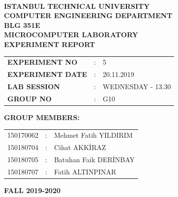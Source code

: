 \documentclass[pdftex,12pt,a4paper]{article}
\begin{document}
\begin{titlepage}
\begin{center}
\textbf{}\\
\textbf{\Large{ISTANBUL TECHNICAL UNIVERSITY}}\\
\vspace{0.5cm}
\textbf{\Large{COMPUTER ENGINEERING DEPARTMENT}}\\
\vspace{2cm}
\textbf{\Large{BLG 351E\\ MICROCOMPUTER LABORATORY\\ EXPERIMENT REPORT}}\\
\vspace{2.8cm}
\begin{table}[ht]
\centering
\Large{
\begin{tabular}{lcl}
\textbf{EXPERIMENT NO}  & : & 5 \\
\textbf{EXPERIMENT DATE}  & : & 20.11.2019 \\
\textbf{LAB SESSION}  & : & WEDNESDAY - 13.30 \\
\textbf{GROUP NO}  & : & G10 \\
\end{tabular}}
\end{table}
\vspace{1cm}
\textbf{\Large{GROUP MEMBERS:}}\\
\begin{table}[ht]
\centering
\Large{
\begin{tabular}{rcl}
150170062  & : & Mehmet Fatih YILDIRIM \\
150180704  & : & Cihat AKK\.{I}RAZ \\
150180705  & : & Batuhan Faik DER\.{I}NBAY \\
150180707  & : & Fatih ALTINPINAR \\
\end{tabular}}
\end{table}
\vspace{2.8cm}
\textbf{\Large{FALL 2019-2020}}

\end{center}

\end{titlepage}

\newpage


\thispagestyle{empty}
\setcounter{tocdepth}{4}
\tableofcontents
\clearpage

\setcounter{page}{1}
\end{document}
